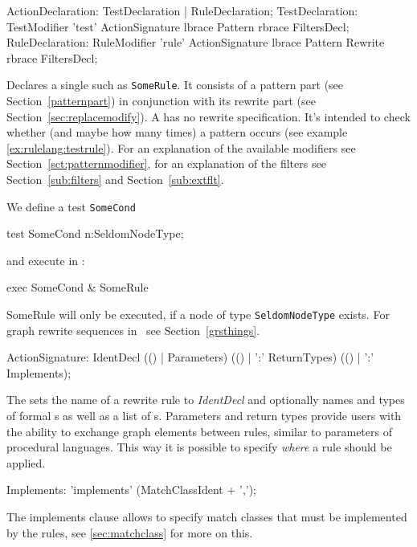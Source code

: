 \begin{rail}
  ActionDeclaration: TestDeclaration | RuleDeclaration;
  TestDeclaration: TestModifier 'test' ActionSignature lbrace Pattern rbrace FiltersDecl;
  RuleDeclaration: RuleModifier 'rule' ActionSignature lbrace Pattern Rewrite rbrace FiltersDecl;
\end{rail}
Declares a single  such as \texttt{SomeRule}.
It consists of a pattern part (see Section~\ref{patternpart}) in conjunction with its rewrite part (see Section~\ref{sec:replacemodify}).
A  has no rewrite specification.
It's intended to check whether (and maybe how many times) a pattern occurs (see example \ref{ex:rulelang:testrule}).
For an explanation of the available modifiers see Section~\ref{sct:patternmodifier},
for an explanation of the filters see Section~\ref{sub:filters} and Section~\ref{sub:extflt}.


\begin{example}
\label{ex:rulelang:testrule}
We define a test \texttt{SomeCond}
\begin{grgen}
test SomeCond {
  n:SeldomNodeType;
}
\end{grgen}
and execute in \GrShell:
\begin{grshell}
  exec SomeCond & SomeRule
\end{grshell}
SomeRule will only be executed, if a node of type \texttt{SeldomNodeType} exists.
For graph rewrite sequences in \GrShell\ see Section~\ref{grsthings}.
\end{example}

\begin{rail}
  ActionSignature: IdentDecl (() | Parameters) (() | ':' ReturnTypes) (() | ':' Implements);
\end{rail}
The  sets the name of a rewrite rule to \emph{IdentDecl} and optionally names and types of formal s as well as a list of s.
Parameters and return types provide users with the ability to exchange graph elements between rules, similar to parameters of procedural languages.
This way it is possible to specify \emph{where} a rule should be applied.

\begin{rail}
  Implements: 'implements' (MatchClassIdent + ',');
\end{rail}
The implements clause allows to specify match classes that must be implemented by the rules, see \ref{sec:matchclass} for more on this.


